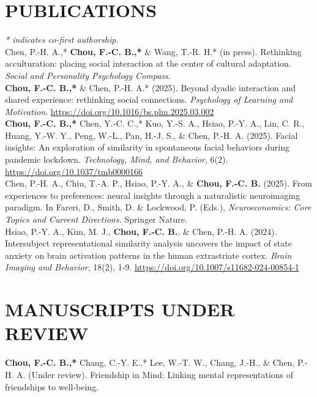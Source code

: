 \documentclass[a4paper,12pt]{article}
\newcommand{\itemspace}{7pt} %
\begin{document}
\section*{PUBLICATIONS}
\textit{* indicates co-first authorship.} \\[10pt]
\noindent Chen, P.-H. A.,* \textbf{Chou, F.-C. B.,*} \& Wang, T.-R. H.* (in press). Rethinking acculturation: placing social interaction at the center of cultural adaptation. \textit{Social and Personality Psychology Compass}.\\[\itemspace]
\noindent \textbf{Chou, F.-C. B.,*} \& Chen, P.-H. A.* (2025). Beyond dyadic interaction and shared experience: rethinking social connections. \textit{Psychology of Learning and Motivation}. \href{https://10.1016/bs.plm.2025.03.002}{https://doi.org/10.1016/bs.plm.2025.03.002} \\[\itemspace]
\noindent\textbf{Chou, F.-C. B.,*} Chen, Y.-C. C.,* Kuo, Y.-S. A., Hsiao, P.-Y. A., Lin, C. R., Huang, Y.-W. Y., Peng, W.-L., Pan, H.-J. S., \& Chen, P.-H. A. (2025). Facial insights: An exploration of similarity in spontaneous facial behaviors during pandemic lockdown. \textit{Technology, Mind, and Behavior}, 6(2). \href{https://doi.org/10.1037/tmb0000166}{https://doi.org/10.1037/tmb0000166} \\[\itemspace]
\noindent Chen, P.-H. A., Chiu, T.-A. P., Hsiao, P.-Y. A., \& \textbf{Chou, F.-C. B.} (2025). From experiences to preferences: neural insights through a naturalistic neuroimaging paradigm. In Fareri, D., Smith, D. \& Lockwood, P. (Eds.), \textit{Neuroeconomics: Core Topics and Current Directions.} Springer Nature.\\[\itemspace]
\noindent Hsiao, P.-Y. A., Kim, M. J., \textbf{Chou, F.-C. B.}, \& Chen, P.-H. A. (2024). Intersubject representational similarity analysis uncovers the impact of state anxiety on brain activation patterns in the human extrastriate cortex. \textit{Brain Imaging and Behavior}, 18(2), 1-9. \href{https://doi.org/10.1007/s11682-024-00854-1}{https://doi.org/10.1007/s11682-024-00854-1}\\[\itemspace]

\section*{MANUSCRIPTS UNDER REVIEW}
\noindent \textbf{Chou, F.-C. B.,*} Chang, C.-Y. E.,* Lee, W.-T. W., Chang, J.-H., \& Chen, P.-H. A. (Under review). Friendship in Mind: Linking mental representations of friendships to well-being.\\[\itemspace]
\end{document}
